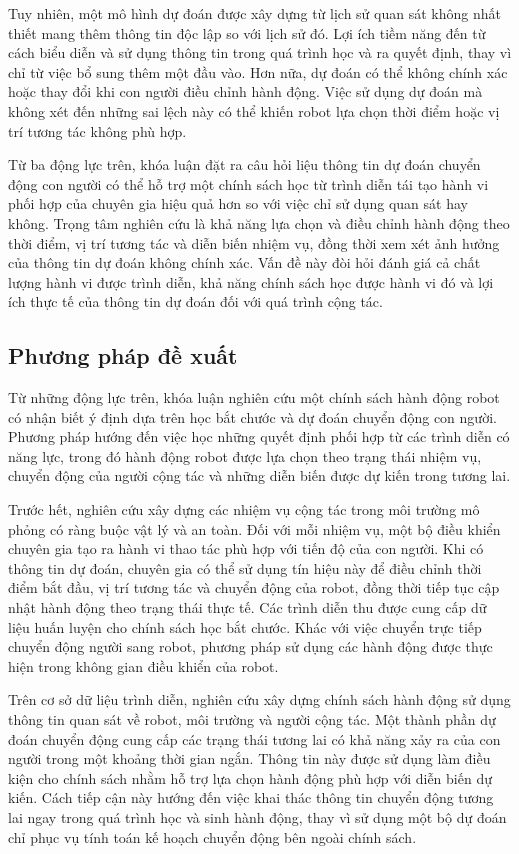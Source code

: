 Tuy nhiên, một mô hình dự đoán được xây dựng từ lịch sử quan sát không nhất thiết mang thêm thông tin độc lập so với lịch sử đó. Lợi ích tiềm năng đến từ cách biểu diễn và sử dụng thông tin trong quá trình học và ra quyết định, thay vì chỉ từ việc bổ sung thêm một đầu vào. Hơn nữa, dự đoán có thể không chính xác hoặc thay đổi khi con người điều chỉnh hành động. Việc sử dụng dự đoán mà không xét đến những sai lệch này có thể khiến robot lựa chọn thời điểm hoặc vị trí tương tác không phù hợp.

Từ ba động lực trên, khóa luận đặt ra câu hỏi liệu thông tin dự đoán chuyển động con người có thể hỗ trợ một chính sách học từ trình diễn tái tạo hành vi phối hợp của chuyên gia hiệu quả hơn so với việc chỉ sử dụng quan sát hay không. Trọng tâm nghiên cứu là khả năng lựa chọn và điều chỉnh hành động theo thời điểm, vị trí tương tác và diễn biến nhiệm vụ, đồng thời xem xét ảnh hưởng của thông tin dự đoán không chính xác. Vấn đề này đòi hỏi đánh giá cả chất lượng hành vi được trình diễn, khả năng chính sách học được hành vi đó và lợi ích thực tế của thông tin dự đoán đối với quá trình cộng tác.


\subsection{Phương pháp đề xuất}

Từ những động lực trên, khóa luận nghiên cứu một chính sách hành động robot có nhận biết ý định dựa trên học bắt chước và dự đoán chuyển động con người. Phương pháp hướng đến việc học những quyết định phối hợp từ các trình diễn có năng lực, trong đó hành động robot được lựa chọn theo trạng thái nhiệm vụ, chuyển động của người cộng tác và những diễn biến được dự kiến trong tương lai.

Trước hết, nghiên cứu xây dựng các nhiệm vụ cộng tác trong môi trường mô phỏng có ràng buộc vật lý và an toàn. Đối với mỗi nhiệm vụ, một bộ điều khiển chuyên gia tạo ra hành vi thao tác phù hợp với tiến độ của con người. Khi có thông tin dự đoán, chuyên gia có thể sử dụng tín hiệu này để điều chỉnh thời điểm bắt đầu, vị trí tương tác và chuyển động của robot, đồng thời tiếp tục cập nhật hành động theo trạng thái thực tế. Các trình diễn thu được cung cấp dữ liệu huấn luyện cho chính sách học bắt chước. Khác với việc chuyển trực tiếp chuyển động người sang robot, phương pháp sử dụng các hành động được thực hiện trong không gian điều khiển của robot.

Trên cơ sở dữ liệu trình diễn, nghiên cứu xây dựng chính sách hành động sử dụng thông tin quan sát về robot, môi trường và người cộng tác. Một thành phần dự đoán chuyển động cung cấp các trạng thái tương lai có khả năng xảy ra của con người trong một khoảng thời gian ngắn. Thông tin này được sử dụng làm điều kiện cho chính sách nhằm hỗ trợ lựa chọn hành động phù hợp với diễn biến dự kiến. Cách tiếp cận này hướng đến việc khai thác thông tin chuyển động tương lai ngay trong quá trình học và sinh hành động, thay vì sử dụng một bộ dự đoán chỉ phục vụ tính toán kế hoạch chuyển động bên ngoài chính sách.

